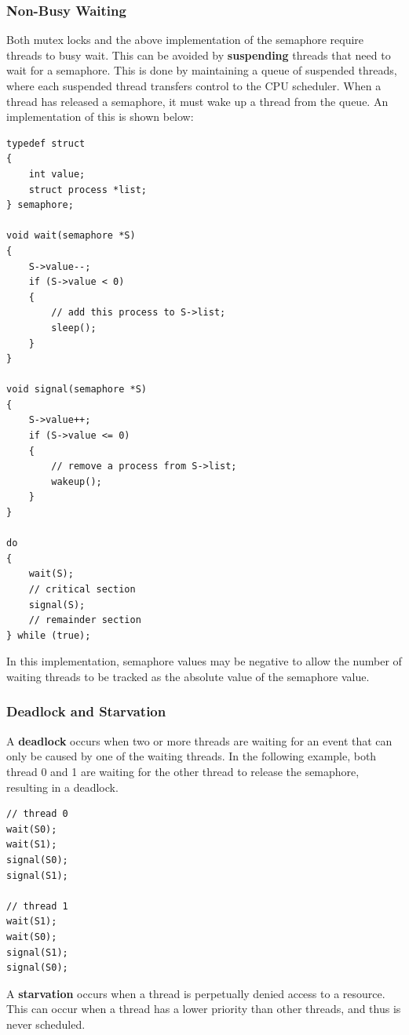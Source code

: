 \documentclass{article}
\begin{document}
\subsubsection{Non-Busy Waiting}
Both mutex locks and the above implementation of the semaphore require
threads to busy wait. This can be avoided by \textbf{suspending}
threads that need to wait for a semaphore. This is done by maintaining
a queue of suspended threads, where each suspended thread transfers
control to the CPU scheduler. When a thread has released a semaphore,
it must wake up a thread from the queue. An implementation of this is
shown below:
\begin{verbatim}
typedef struct
{
    int value;
    struct process *list;
} semaphore;

void wait(semaphore *S)
{
    S->value--;
    if (S->value < 0)
    {
        // add this process to S->list;
        sleep();
    }
}

void signal(semaphore *S)
{
    S->value++;
    if (S->value <= 0)
    {
        // remove a process from S->list;
        wakeup();
    }
}

do
{
    wait(S);
    // critical section
    signal(S);
    // remainder section
} while (true);
\end{verbatim}
In this implementation, semaphore values may be negative to allow the
number of waiting threads to be tracked as the absolute value of the
semaphore value.
\subsubsection{Deadlock and Starvation}
A \textbf{deadlock} occurs when two or more threads are waiting for an
event that can only be caused by one of the waiting threads. In the
following example, both thread 0 and 1 are waiting for the other thread
to release the semaphore, resulting in a deadlock.
\begin{verbatim}
// thread 0
wait(S0);
wait(S1);
signal(S0);
signal(S1);

// thread 1
wait(S1);
wait(S0);
signal(S1);
signal(S0);
\end{verbatim}
A \textbf{starvation} occurs when a thread is perpetually denied access
to a resource. This can occur when a thread has a lower priority than
other threads, and thus is never scheduled.
\end{document}
